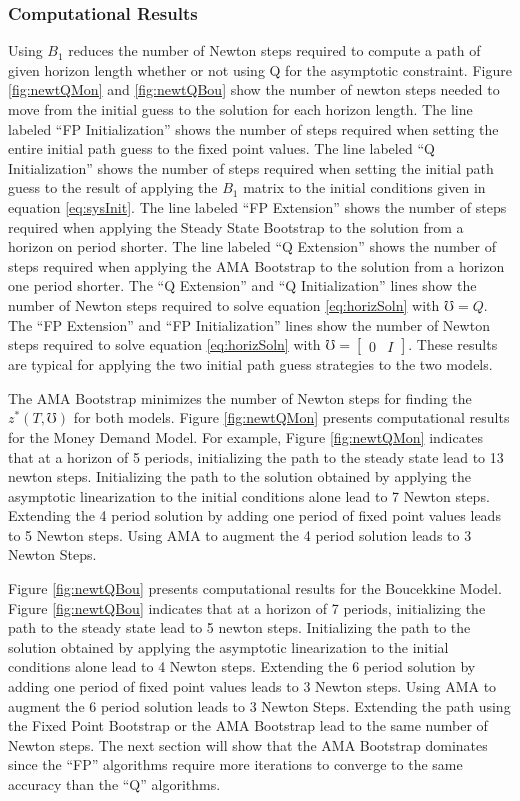 \documentclass[12pt]{article}
\begin{document}
\subsubsection{Computational Results}

Using $B_1$ reduces the number of Newton steps required to compute a
path of given horizon length
whether or not using Q for the asymptotic constraint.
Figure \ref{fig:newtQMon}  and \ref{fig:newtQBou} show the number of 
newton steps needed to 
move from the initial guess to the solution for each horizon length.
The line labeled ``FP Initialization'' shows the number of steps required
when setting the entire initial path guess to the fixed point values.
The line labeled ``Q Initialization'' shows the number of steps required
when setting the initial path guess to the result of applying
the $B_1$ matrix to the initial conditions given in equation \ref{eq:sysInit}.
The line labeled ``FP Extension'' shows the number of steps required
when applying the Steady State Bootstrap to the  solution from  a horizon
on period shorter.
The line labeled ``Q Extension'' shows the number of steps required
when applying the AMA Bootstrap to the  solution from  a horizon
one period shorter. 
The ``Q Extension'' and ``Q Initialization''
lines show the number of Newton steps required to solve
equation \ref{eq:horizSoln} with $\mho=Q$.
The ``FP Extension'' and ``FP Initialization''
lines show the number of Newton steps required to solve
equation \ref{eq:horizSoln} with $\mho=\begin{bmatrix}0 &I\end{bmatrix}$.
These results are  typical
for applying the two initial path guess strategies to the two models.

The AMA Bootstrap minimizes the number of Newton steps for finding the 
$z^\ast(T,\mho)$ for both models. 
Figure \ref{fig:newtQMon} presents computational results for the Money Demand
Model.
For example,
Figure \ref{fig:newtQMon} indicates
that at a horizon of 5 periods, initializing the path to the steady state
lead to 13 newton steps.
Initializing the path to the solution
obtained by applying the asymptotic linearization to the initial conditions
alone lead to 7 Newton steps. Extending the 4 period solution by adding one
period of fixed point values leads to 5 Newton steps. Using AMA to augment
the 4 period solution leads to 3 Newton Steps.

Figure \ref{fig:newtQBou} presents computational results for the 
Boucekkine Model.
Figure \ref{fig:newtQBou} indicates
that at a horizon of 7 periods, initializing the path to the steady state
lead to 5 newton steps.
Initializing the path to the solution
obtained by applying the asymptotic linearization to the initial conditions
alone lead to 4 Newton steps. Extending the 6 period solution by adding one
period of fixed point values leads to 3 Newton steps. Using AMA to augment
the 6 period solution leads to 3 Newton Steps.
Extending the path using the Fixed Point Bootstrap or the AMA Bootstrap
lead to the same number of Newton steps.
The next section will show that the AMA Bootstrap dominates since
the ``FP'' algorithms require more iterations to converge 
to the same accuracy than the ``Q'' algorithms.
\end{document}
